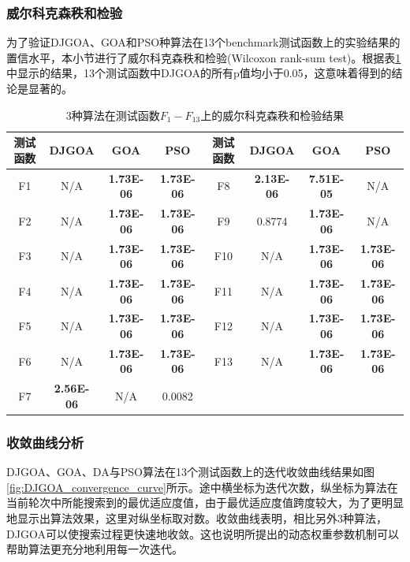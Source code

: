 \subsubsection{威尔科克森秩和检验}
为了验证DJGOA、GOA和PSO种算法在13个benchmark测试函数上的实验结果的置信水平，本小节进行了威尔科克森秩和检验(Wilcoxon rank-sum test)。根据表\ref{tab:wilcoxon_rank_sum_test_DJGOA}中显示的结果，13个测试函数中DJGOA的所有p值均小于0.05，这意味着得到的结论是显著的。
\begin{table}[!htbp]
    \centering
    \caption{3种算法在测试函数$F_1-F_{13}$上的威尔科克森秩和检验结果}
    \label{tab:wilcoxon_rank_sum_test_DJGOA}
    \small
    \renewcommand\arraystretch{1.5} 
\begin{tabular}{c c c c || c c c c}
  \hline
  测试函数 & DJGOA & GOA & PSO &测试函数 & DJGOA & GOA & PSO\\
  \hline
  F1 & N/A & \textbf{1.73E-06}&\textbf{1.73E-06}&F8 & \textbf{2.13E-06} & \textbf{7.51E-05}&N/A \\
  \hline
  F2 & N/A & \textbf{1.73E-06}&\textbf{1.73E-06}&F9 & 0.8774 &\textbf{1.73E-06} &N/A \\
  \hline
  F3 & N/A & \textbf{1.73E-06}&\textbf{1.73E-06}&F10 & N/A & \textbf{1.73E-06}&\textbf{1.73E-06} \\
  \hline
  F4 & N/A & \textbf{1.73E-06}&\textbf{1.73E-06}&F11 & N/A & \textbf{1.73E-06}&\textbf{1.73E-06} \\
  \hline
  F5 & N/A & \textbf{1.73E-06}&\textbf{1.73E-06}&F12 & N/A & \textbf{1.73E-06}&\textbf{1.73E-06} \\
  \hline
  F6 & N/A & \textbf{1.73E-06}&\textbf{1.73E-06}&F13 & N/A & \textbf{1.73E-06}&\textbf{1.73E-06} \\
  \hline
  F7 & \textbf{2.56E-06} & N/A&0.0082&  &   &  &  \\
  \hline
  
  \hline
\end{tabular}
\end{table}


\subsubsection{收敛曲线分析}
DJGOA、GOA、DA与PSO算法在13个测试函数上的迭代收敛曲线结果如图\ref{fig:DJGOA_convergence_curve}所示。途中横坐标为迭代次数，纵坐标为算法在当前轮次中所能搜索到的最优适应度值，由于最优适应度值跨度较大，为了更明显地显示出算法效果，这里对纵坐标取对数。收敛曲线表明，相比另外3种算法，DJGOA可以使搜索过程更快速地收敛。这也说明所提出的动态权重参数机制可以帮助算法更充分地利用每一次迭代。

